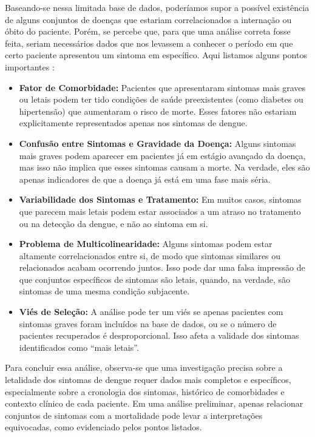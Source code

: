 \documentclass[a4paper, 12pt, twoside]{article}
\begin{document}
Baseando-se nessa limitada base de dados, poderíamos supor a possível existência de alguns conjuntos de doenças que estariam correlacionados a internação ou óbito do paciente. Porém, se percebe que, para que uma análise correta fosse feita, seriam necessários dados que nos levassem a conhecer o período em que certo paciente apresentou um sintoma em específico. Aqui listamos alguns pontos importantes :

\begin{flushleft}
\begin{itemize}[nosep]
    \item \textbf{Fator de Comorbidade:} Pacientes que apresentaram sintomas mais graves ou letais podem ter tido condições de saúde preexistentes (como diabetes ou hipertensão) que aumentaram o risco de morte. Esses fatores não estariam explicitamente representados apenas nos sintomas de dengue.
    
    \item \textbf{Confusão entre Sintomas e Gravidade da Doença:} Alguns sintomas mais graves podem aparecer em pacientes já em estágio avançado da doença, mas isso não implica que esses sintomas causam a morte. Na verdade, eles são apenas indicadores de que a doença já está em uma fase mais séria.
    
    \item \textbf{Variabilidade dos Sintomas e Tratamento:} Em muitos casos, sintomas que parecem mais letais podem estar associados a um atraso no tratamento ou na detecção da dengue, e não ao sintoma em si.
    
    \item \textbf{Problema de Multicolinearidade:} Alguns sintomas podem estar altamente correlacionados entre si, de modo que sintomas similares ou relacionados acabam ocorrendo juntos. Isso pode dar uma falsa impressão de que conjuntos específicos de sintomas são letais, quando, na verdade, são sintomas de uma mesma condição subjacente.
    
    \item \textbf{Viés de Seleção:} A análise pode ter um viés se apenas pacientes com sintomas graves foram incluídos na base de dados, ou se o número de pacientes recuperados é desproporcional. Isso afeta a validade dos sintomas identificados como “mais letais”.
\end{itemize}
\end{flushleft} 

Para concluir essa análise, observa-se que uma investigação precisa sobre a letalidade dos sintomas de dengue requer dados mais completos e específicos, especialmente sobre a cronologia dos sintomas, histórico de comorbidades e contexto clínico de cada paciente. Em uma análise preliminar, apenas relacionar conjuntos de sintomas com a mortalidade pode levar a interpretações equivocadas, como evidenciado pelos pontos listados.
\end{document}
